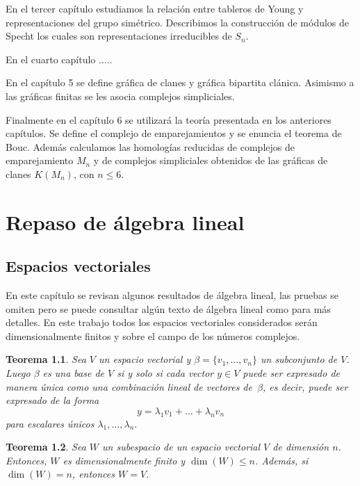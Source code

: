 \documentclass[12pt]{book}
\newtheorem{theorem}{Teorema}[section]
\theoremstyle{definition}
\newcounter{in}
\newcounter{ini}
\begin{document}
En el tercer capítulo estudiamos la relación entre tableros de Young
y representaciones del grupo simétrico. Describimos la construcción de
módulos de Specht los cuales son representaciones irreducibles de
$S_{n}$.

En el cuarto capítulo .....

En el capítulo 5 se define gráfica de clanes y gráfica
bipartita clánica. Asimismo a las gráficas finitas se les asocia complejos
simpliciales.

Finalmente en el capítulo 6 se utilizará la teoría presentada en los
anteriores capítulos. Se define el complejo de emparejamientos y se
enuncia el teorema de Bouc.  Además calculamos las homologías
reducidas de complejos de emparejamiento $M_{n}$ y de complejos
simpliciales obtenidos de las gráficas de clanes $K(M_{n})$, con $n\leq 6$.

\tableofcontents


 \newpage \thispagestyle{empty}

\chapter{Repaso de álgebra lineal}
\label{cha:repaso-algebra-lineal}

\section{Espacios vectoriales}

En este capítulo se revisan algunos resultados de álgebra lineal, las
pruebas se omiten pero se puede consultar algún texto de álgebra
lineal como \cite{friedberg1982algebra}
para más  detalles. En este trabajo todos los espacios vectoriales
considerados serán dimensionalmente finitos y sobre el campo de los
números complejos.

\begin{theorem}
  \label{clunica}
  Sea $V$ un espacio vectorial y $\beta=\{v_{1},\dots,v_{n}\}$ un
  subconjunto de $V$. Luego $\beta$ es una base de $V$ si y solo si
  cada vector $y\in V$ puede ser expresado de manera única como una
  combinación lineal de vectores de~$\beta$, es decir, puede ser
  expresado de la forma
  $$y=\lambda_{1}v_{1}+\ldots+\lambda_{n}v_{n}$$
  para escalares únicos $\lambda_{1},\ldots,\lambda_{n}.$
\end{theorem}

\begin{theorem}
  \label{esp-iguales}
  Sea $W$ un subespacio de un espacio vectorial $V$ de dimensión
  $n$. Entonces, $W$ es dimensionalmente finito y $\dim(W)\leq
  n$. Además, si $\dim(W)=n$, entonces $W=V$.
\end{theorem}
\end{document}
